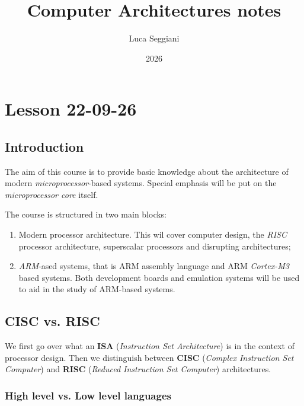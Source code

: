 \documentclass[a4paper,11pt]{article}
\title{Computer Architectures notes}
\author{Luca Seggiani}
\date{2026}
\begin{document}
\section{Lesson 22-09-26}

\thispagestyle{empty}
\pagestyle{fancy}

\subsection{Introduction}

The aim of this course is to provide basic knowledge about the architecture of modern \textit{microprocessor}-based systems.
Special emphasis will be put on the \textit{microprocessor core} itself.

The course is structured in two main blocks:
\begin{enumerate}
	\item Modern processor architecture. This wil cover computer design, the \textit{RISC} processor architecture, superscalar processors and disrupting architectures;
	\item \textit{ARM}-ased systems, that is ARM assembly language and ARM \textit{Cortex-M3} based systems. Both development boards and emulation systems will be used to aid in the study of ARM-based systems.
\end{enumerate}

\subsection{CISC vs. RISC}

We first go over what an \textbf{ISA} (\textit{Instruction Set Architecture}) is in the context of processor design.
Then we distinguish between \textbf{CISC} (\textit{Complex Instruction Set Computer}) and \textbf{RISC} (\textit{Reduced Instruction Set Computer}) architectures.

\subsubsection{High level vs. Low level languages}
\end{document}
